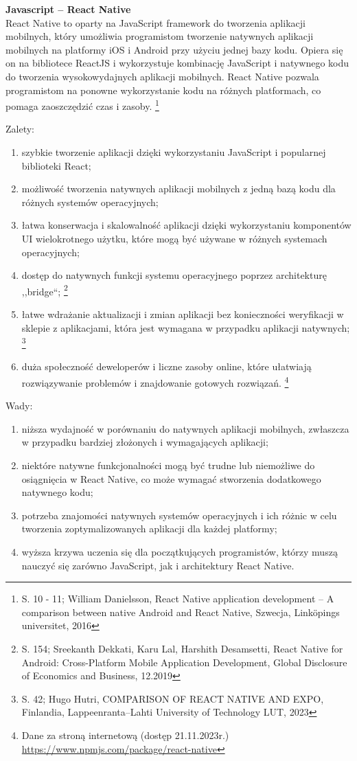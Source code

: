 \documentclass[12pt, a4paper, twoside, openany]{book}
\begin{document}
\textbf{Javascript -- React Native\\}
\indent React Native to oparty na JavaScript framework do tworzenia aplikacji mobilnych, który umożliwia programistom tworzenie natywnych aplikacji mobilnych na platformy iOS i Android przy użyciu jednej bazy kodu.
Opiera się on na bibliotece ReactJS i wykorzystuje kombinację JavaScript i natywnego kodu do tworzenia wysokowydajnych aplikacji mobilnych.
React Native pozwala programistom na ponowne wykorzystanie kodu na różnych platformach, co pomaga zaoszczędzić czas i zasoby. \footnote{S. 10 - 11; William Danielsson, React Native application development – A comparison between native Android and React Native, Szwecja, Linköpings universitet, 2016}

Zalety:
\begin{enumerate}[label=--]
    \item szybkie tworzenie aplikacji dzięki wykorzystaniu JavaScript i popularnej biblioteki React;
    \item możliwość tworzenia natywnych aplikacji mobilnych z jedną bazą kodu dla różnych systemów operacyjnych;
    \item łatwa konserwacja i skalowalność aplikacji dzięki wykorzystaniu komponentów UI wielokrotnego użytku, które mogą być używane w różnych systemach operacyjnych;
    \item dostęp do natywnych funkcji systemu operacyjnego poprzez architekturę ,,bridge``; \footnote{S. 154; Sreekanth Dekkati, Karu Lal, Harshith Desamsetti, React Native for Android: Cross-Platform Mobile Application Development, Global Disclosure of Economics and Business, 12.2019}
    \item łatwe wdrażanie aktualizacji i zmian aplikacji bez konieczności weryfikacji w sklepie z aplikacjami, która jest wymagana w przypadku aplikacji natywnych; \footnote{S. 42; Hugo Hutri, COMPARISON OF REACT NATIVE AND EXPO, Finlandia, Lappeenranta–Lahti University of Technology LUT, 2023}
    \item duża społeczność deweloperów i liczne zasoby online, które ułatwiają rozwiązywanie problemów i znajdowanie gotowych rozwiązań. \footnote{Dane za stroną internetową (dostęp 21.11.2023r.) \url{https://www.npmjs.com/package/react-native}}
\end{enumerate}

Wady:
\begin{enumerate}[label=--]
    \item niższa wydajność w porównaniu do natywnych aplikacji mobilnych, zwłaszcza w przypadku bardziej złożonych i wymagających aplikacji;
    \item niektóre natywne funkcjonalności mogą być trudne lub niemożliwe do osiągnięcia w React Native, co może wymagać stworzenia dodatkowego natywnego kodu;
    \item potrzeba znajomości natywnych systemów operacyjnych i ich różnic w celu tworzenia zoptymalizowanych aplikacji dla każdej platformy;
    \item wyższa krzywa uczenia się dla początkujących programistów, którzy muszą nauczyć się zarówno JavaScript, jak i architektury React Native.
\end{enumerate}
\end{document}
